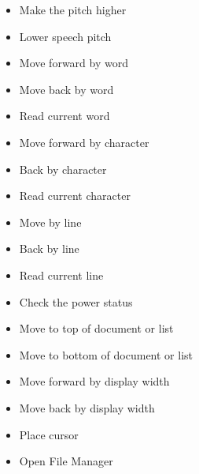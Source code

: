 \documentclass[10pt,letterpaper,twoside]{report}
\begin{document}
\begin{enumerate}
\begin{itemize}
		      \item Make the pitch higher 
		      \item Lower speech pitch 
		      \item Move forward by word 
		      \item Move back by word 
		      \item Read current word 
		      \item Move forward by character 
		      \item Back by character 
		      \item Read current character 
		      \item Move by line 
		      \item Back by line 
		      \item Read current line 
		      \item Check the power status 
		      \item Move to top of document or list 
		      \item Move to bottom of document or list 
		      \item Move forward by display width 
		      \item Move back by display width  
		      \item Place cursor 
		      \item Open File Manager 

\end{itemize}
\end{enumerate}
\end{document}
